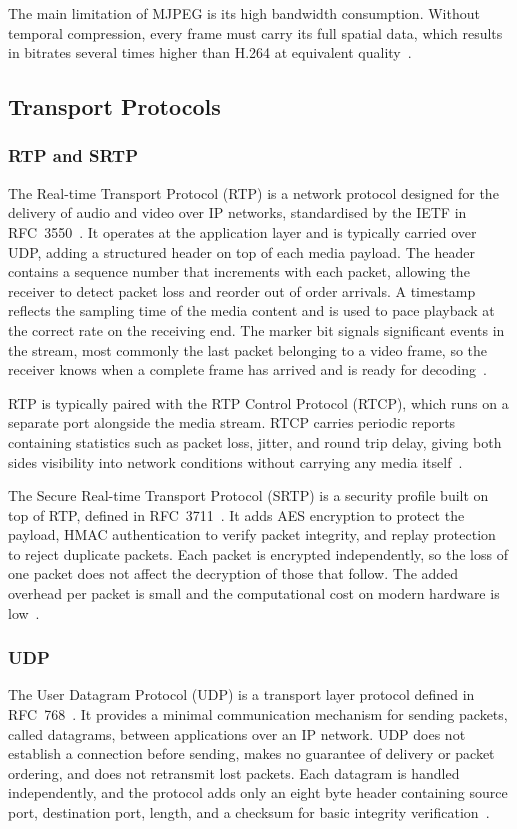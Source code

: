 The main limitation of MJPEG is its high bandwidth consumption. Without temporal compression, every frame must carry its full spatial data, which results in bitrates several times higher than H.264 at equivalent quality~\cite{kaknjo2018videolatency}.

\vspace{5mm}
\subsection{Transport Protocols}\label{subsec:transport-protocols}
\subsubsection{RTP and SRTP}\label{subsubsec:rtp-srtp}
The Real-time Transport Protocol (RTP) is a network protocol designed for the delivery of audio and video over IP networks, standardised by the IETF in RFC~3550~\cite{rfc3550}. It operates at the application layer and is typically carried over UDP, adding a structured header on top of each media payload. The header contains a sequence number that increments with each packet, allowing the receiver to detect packet loss and reorder out of order arrivals. A timestamp reflects the sampling time of the media content and is used to pace playback at the correct rate on the receiving end. The marker bit signals significant events in the stream, most commonly the last packet belonging to a video frame, so the receiver knows when a complete frame has arrived and is ready for decoding~\cite{rfc3550}.
 
RTP is typically paired with the RTP Control Protocol (RTCP), which runs on a separate port alongside the media stream. RTCP carries periodic reports containing statistics such as packet loss, jitter, and round trip delay, giving both sides visibility into network conditions without carrying any media itself~\cite{rfc3550}.
 
The Secure Real-time Transport Protocol (SRTP) is a security profile built on top of RTP, defined in RFC~3711~\cite{rfc3711}. It adds AES encryption to protect the payload, HMAC authentication to verify packet integrity, and replay protection to reject duplicate packets. Each packet is encrypted independently, so the loss of one packet does not affect the decryption of those that follow. The added overhead per packet is small and the computational cost on modern hardware is low~\cite{rfc3711}.

\subsubsection{UDP}\label{subsubsec:udp}
The User Datagram Protocol (UDP) is a transport layer protocol defined in RFC~768~\cite{rfc768}. It provides a minimal communication mechanism for sending packets, called datagrams, between applications over an IP network. UDP does not establish a connection before sending, makes no guarantee of delivery or packet ordering, and does not retransmit lost packets. Each datagram is handled independently, and the protocol adds only an eight byte header containing source port, destination port, length, and a checksum for basic integrity verification~\cite{rfc768}.
 
